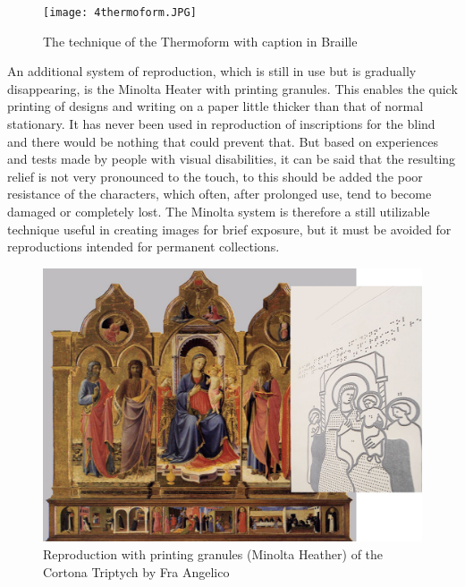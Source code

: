 \documentclass[amsthm,ebook]{saparticle}
\begin{document}
\begin{figure}[!hbp]
\centering
 \texttt{[image: 4thermoform.JPG]}
\caption{The technique of the Thermoform with caption in Braille}
\label{fig:4}
\end{figure}


An additional system of reproduction, which is still in use but is gradually disappearing, is the Minolta Heater with
printing granules. This enables the quick printing of designs and writing on a paper little thicker than that of normal
stationary. It has never been used in reproduction of inscriptions for the blind and there would be nothing that could
prevent that. But based on experiences and tests made by people with visual disabilities, it can be said that the
resulting relief is not very pronounced to the touch, to this should be added the poor resistance of the characters,
which often, after prolonged use, tend to become damaged or completely lost. The Minolta system is therefore a still
utilizable technique useful in creating images for brief exposure, but it must be avoided for reproductions intended
for permanent collections.



\begin{figure}[!hbp]
\centering
 \includegraphics[width=\columnwidth]{5Minoltaheather.jpg}
\caption{Reproduction with printing granules (Minolta Heather) of the Cortona Triptych by Fra Angelico}
\label{fig:5}
\end{figure}
\end{document}
